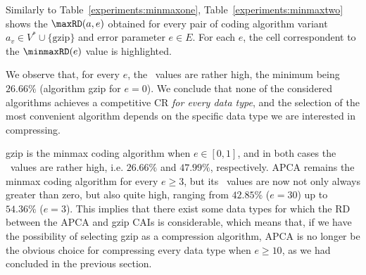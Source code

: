 \clearpage





Similarly to Table~\ref{experiments:minmaxone}, Table~\ref{experiments:minmaxtwo} shows the $\text{\maxRD}(a, e)$ obtained for every pair of coding algorithm variant $a_v \in V^* \cup \{\text{gzip}\}$ and error parameter $e \in E$. For each $e$, the cell correspondent to the $\text{\minmaxRD}(e)$ value is highlighted.


We observe that, for every $e$, the \minmaxRD\ values are rather high, the minimum being $26.66\%$ (algorithm gzip for $e=0$). We conclude that none of the considered algorithms achieves a competitive CR \textit{for every data type}, and the selection of the most convenient algorithm depends on the specific data type we are interested in compressing.


gzip is the minmax coding algorithm when $e \in [0, 1]$, and in both cases the \minmaxRD\ values are rather high, i.e. $26.66\%$ and $47.99\%$, respectively. APCA remains the minmax coding algorithm for every $e \geq 3$, but its \minmaxRD\ values are now not only always greater than zero, but also quite high, ranging from $42.85\%$ ($e=30$) up to $54.36\%$ ($e=3$). This implies that there exist some data types for which the RD between the APCA and gzip CAIs is considerable, which means that, if we have the possibility of selecting gzip as a compression algorithm, APCA is no longer be the obvious choice for compressing every data type when $e \geq 10$, as we had concluded in the previous section. 


\clearpage




